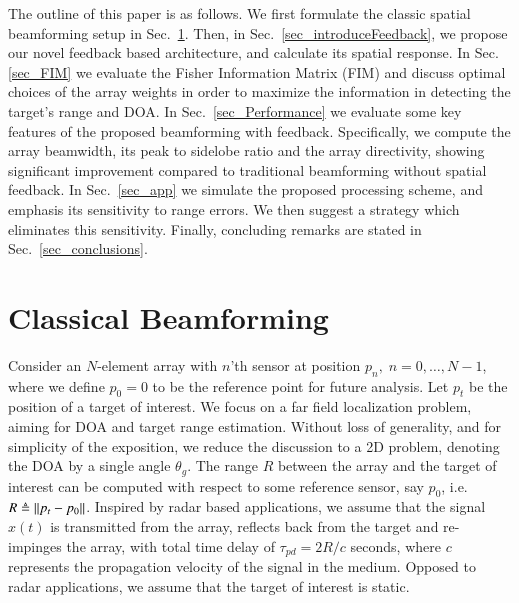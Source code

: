 \par The outline of this paper is as follows. We first formulate the classic spatial beamforming setup in Sec.~\ref{sec:setup}. Then, in Sec.~\ref{sec_introduceFeedback}, we propose our novel feedback based architecture, and calculate its spatial response. In Sec.~ \ref{sec_FIM} we evaluate the Fisher Information Matrix (FIM) and discuss optimal choices of the array weights in order to  maximize the information in detecting the target's range and DOA. In Sec.~\ref{sec_Performance} we evaluate some key features of the proposed beamforming with feedback. Specifically, we compute the array beamwidth, its peak to sidelobe ratio and the array directivity, showing significant improvement compared to traditional beamforming without spatial feedback. 
In Sec.~\ref{sec_app} we simulate the proposed processing scheme, and emphasis its sensitivity to range errors. We then suggest a strategy which eliminates this sensitivity. Finally, concluding remarks are stated in Sec.~\ref{sec_conclusions}.
\section{Classical Beamforming }\label{sec:setup}
Consider an $N$-element array with $n$'th sensor at position $p_n,\; n=0,\ldots,N-1$, where we define $p_{0}=0$ to be the reference point for future analysis. Let $p_t$ be the position of a target of interest. We focus on a far field localization problem, aiming for DOA and target range estimation. Without loss of generality, and for simplicity of the exposition, we reduce the discussion to a 2D problem, denoting the DOA by a single angle $\theta_g$. The range $R$ between the array and the target of interest can be computed with respect to some reference sensor, say $p_{0}$, i.e. $R\triangleq\left\Vert p_{t}-p_{0}\right\Vert$. 
Inspired by radar based applications, we assume that the signal $x(t)$ is transmitted from the array, reflects back from the target and re-impinges the array, with total time delay of $\tau_{pd}=2R/c$ seconds, where $c$ represents the propagation velocity of the signal in the medium. Opposed to radar applications, we assume that the target of interest is static. 

